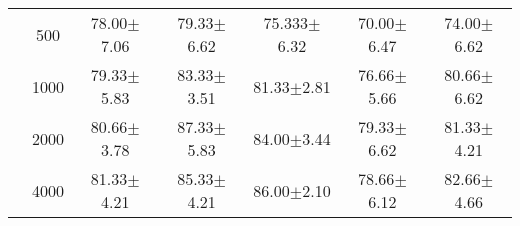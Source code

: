 \begin{table}[H]
\begin{tabular}{|c|c|c c c c c|}
& 500 	&78.00$\pm$7.06		&79.33$\pm$6.62		&75.333$\pm$6.32	&70.00$\pm$6.47		&74.00$\pm$6.62 \\\cline{2-7}

& 1000 	&79.33$\pm$5.83		&83.33$\pm$3.51		&81.33$\pm$2.81		&76.66$\pm$5.66		&80.66$\pm$6.62 \\\cline{2-7}
	
& 2000 	&80.66$\pm$3.78		&87.33$\pm$5.83		&84.00$\pm$3.44		&79.33$\pm$6.62		&81.33$\pm$4.21 \\\cline{2-7}

& 4000	 	&81.33$\pm$4.21		&85.33$\pm$4.21		&86.00$\pm$2.10		&78.66$\pm$6.12		&82.66$\pm$4.66 \\\midrule




\end{tabular}
\end{table}


